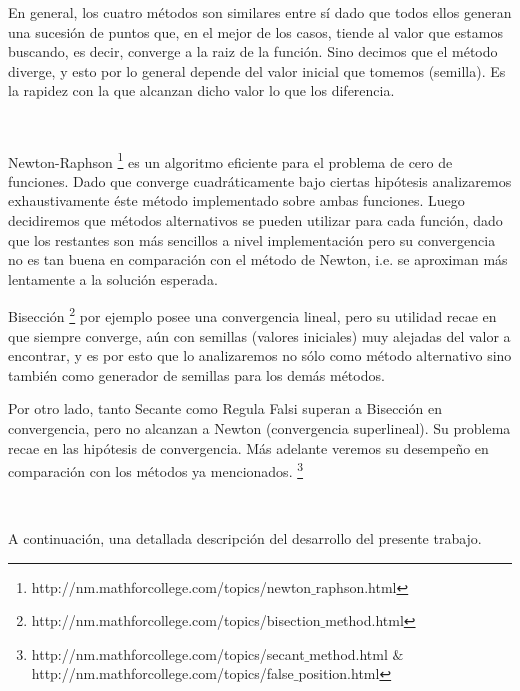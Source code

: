 En general, los cuatro métodos son similares entre sí dado que todos ellos generan una sucesión de puntos que, en el mejor de los casos, tiende al valor que estamos buscando, es decir, converge a la raiz de la función. Sino decimos que el método diverge, y esto por lo general depende del valor inicial que tomemos (semilla). Es la rapidez con la que alcanzan dicho valor lo que los diferencia.



~

Newton-Raphson \footnote{http://nm.mathforcollege.com/topics/newton$\_$raphson.html} es un algoritmo eficiente para el problema de cero de funciones. Dado que converge cuadráticamente bajo ciertas hipótesis analizaremos exhaustivamente éste método implementado sobre ambas funciones. Luego decidiremos que métodos alternativos se pueden utilizar para cada función, dado que los restantes son más sencillos a nivel implementación pero su convergencia no es tan buena en comparación con el método de Newton, i.e. se aproximan más lentamente a la solución esperada.

Bisección \footnote{http://nm.mathforcollege.com/topics/bisection$\_$method.html} por ejemplo posee una convergencia lineal, pero su utilidad recae en que siempre converge, aún con semillas (valores iniciales) muy alejadas del valor a encontrar, y es por esto que lo analizaremos no sólo como método alternativo sino también como generador de semillas para los demás métodos.

Por otro lado, tanto Secante como Regula Falsi superan a Bisección en convergencia, pero no alcanzan a Newton (convergencia superlineal). Su problema recae en las hipótesis de convergencia. Más adelante veremos su desempeño en comparación con los métodos ya mencionados. 
\footnote{http://nm.mathforcollege.com/topics/secant$\_$method.html $\&$ http://nm.mathforcollege.com/topics/false$\_$position.html}

~

A continuación, una detallada descripción del desarrollo del presente trabajo.
